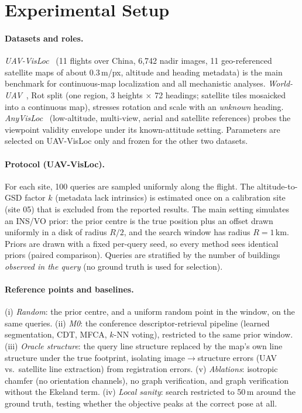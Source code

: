 \section{Experimental Setup}
\label{sec:setup}

\paragraph{Datasets and roles.}
\emph{UAV-VisLoc}~\cite{xu2024uavvisloc} (11 flights over China, 6{,}742 nadir
images, 11 geo-referenced satellite maps of about 0.3\,m/px, altitude and
heading metadata) is the main benchmark for continuous-map localization and all
mechanistic analyses. \emph{World-UAV}~\cite{wu2025uavgeoloc}, Rot split
(one region, 3 heights $\times$ 72 headings; satellite tiles mosaicked into a
continuous map), stresses rotation and scale with an \emph{unknown} heading.
\emph{AnyVisLoc}~\cite{ye2026anyvisloc} (low-altitude, multi-view, aerial and
satellite references) probes the viewpoint validity envelope under its
known-attitude setting. Parameters are selected on UAV-VisLoc only and frozen
for the other two datasets.

\paragraph{Protocol (UAV-VisLoc).}
For each site, 100 queries are sampled uniformly along the flight. The
altitude-to-GSD factor $k$ (metadata lack intrinsics) is estimated once on a
calibration site (site 05) that is excluded from the reported results. The
main setting simulates an INS/VO prior: the prior centre is the true position
plus an offset drawn uniformly in a disk of radius $R/2$, and the search window
has radius $R=1$\,km. Priors are drawn with a fixed per-query seed, so every
method sees identical priors (paired comparison). Queries are stratified by
the number of buildings \emph{observed in the query} (no ground truth is used
for selection).

\paragraph{Reference points and baselines.}
(i) \emph{Random}: the prior centre, and a uniform random point in the window,
on the same queries. (ii) \emph{M0}: the conference descriptor-retrieval
pipeline (learned segmentation, CDT, MFCA, $k$-NN voting), restricted to the
same prior window. (iii) \emph{Oracle structure}: the query line structure
replaced by the map's own line structure under the true footprint, isolating
image$\rightarrow$structure errors (UAV vs.\ satellite line extraction) from
registration errors. (v) \emph{Ablations}: isotropic chamfer (no orientation
channels), no graph verification, and graph verification without the Ekeland
term. (iv) \emph{Local
sanity}: search restricted to 50\,m around the ground truth, testing whether
the objective peaks at the correct pose at all.

